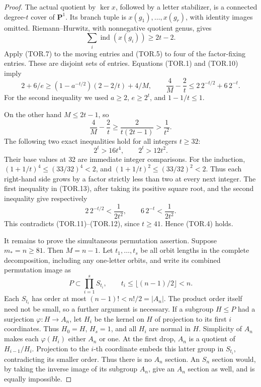 \begin{proof}
The actual quotient by \(\ker x\), followed by a letter stabilizer,
is a connected degree-\(t\) cover of \(\mathbf P^1\). Its branch
tuple is \(x(g_1),\ldots,x(g_r)\), with identity images omitted.
Riemann--Hurwitz, with nonnegative quotient genus, gives
\[
                  \sum_i\operatorname{ind}(x(g_i))\ge2t-2.
 \tag{TOR.10}
\]
Apply (TOR.7) to the moving entries and (TOR.5) to four of the
factor-fixing entries. These are disjoint sets of entries. Equations
(TOR.1) and (TOR.10) imply
\[
 2+6/e\ge(1-a^{-t/2})(2-2/t)+4/M,
 \qquad
 \frac4M-\frac2t
       \le2\,2^{-t/2}+6\,2^{-t}.
 \tag{TOR.11}
\]
For the second inequality we used \(a\ge2\), \(e\ge2^t\),
and \(1-1/t\le1\).

On the other hand \(M\le2t-1\), so
\[
 \frac4M-\frac2t\ge
       \frac2{t(2t-1)}>\frac1{t^2}.
 \tag{TOR.12}
\]
The following two exact inequalities hold for all integers \(t\ge32\):
\[
                         2^t>16t^4,
                         \qquad 2^t>12t^2.
 \tag{TOR.13}
\]
Their base values at \(32\) are immediate integer comparisons.
For the induction, \((1+1/t)^4\le(33/32)^4<2\), and
\((1+1/t)^2\le(33/32)^2<2\). Thus each right-hand side grows
by a factor strictly less than two at every next integer.
The first inequality in (TOR.13), after taking its positive square
root, and the second inequality give respectively
\[
                  2\,2^{-t/2}<\frac1{2t^2},
                  \qquad6\,2^{-t}<\frac1{2t^2}.
 \tag{TOR.14}
\]
This contradicts (TOR.11)--(TOR.12), since \(t\ge41\).
Hence (TOR.4) holds.

It remains to prove the simultaneous permutation assertion. Suppose
\(m_*=n\ge81\). Then \(M=n-1\). Let \(t_1,\ldots,t_s\)
be all orbit lengths in the complete decomposition, including any
one-letter orbits, and write its combined permutation image as
\[
                  P\subset\prod_{i=1}^s S_{t_i},
             \qquad t_i\le\lfloor(n-1)/2\rfloor<n.
 \tag{TOR.15}
\]
Each \(S_{t_i}\) has order at most \((n-1)!<n!/2=|A_n|\).
The product order itself need not be small, so a further argument
is necessary. If a subgroup \(H\le P\) had a surjection
\(\varphi:H\to A_n\), let \(H_i\) be the kernel on \(H\)
of projection to its first \(i\) coordinates. Thus \(H_0=H\),
\(H_s=1\), and all \(H_i\) are normal in \(H\). Simplicity of
\(A_n\) makes each \(\varphi(H_i)\) either \(A_n\) or one.
At the first drop, \(A_n\) is a quotient of
\(H_{i-1}/H_i\). Projection to the \(i\)-th coordinate embeds
this latter group in \(S_{t_i}\), contradicting its smaller order.
Thus there is no \(A_n\) section. An \(S_n\) section would,
by taking the inverse image of its subgroup \(A_n\), give an
\(A_n\) section as well, and is equally impossible.
\end{proof}

